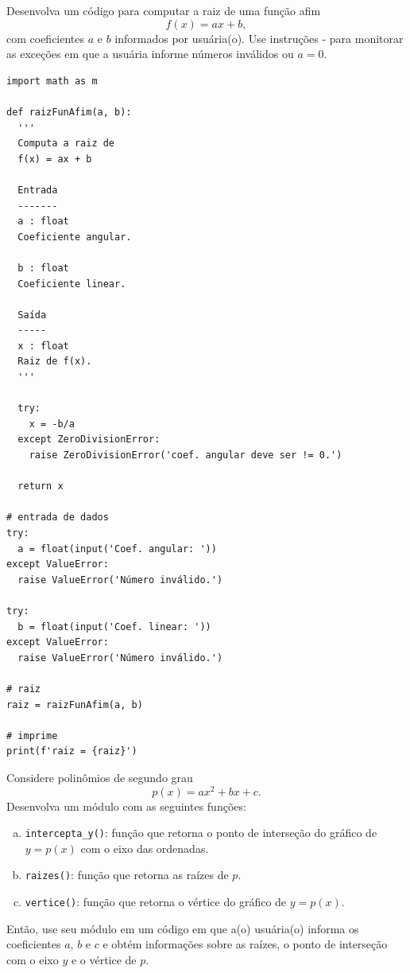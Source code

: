 \begin{exer}
  Desenvolva um código para computar a raiz de uma função afim
  \begin{equation}
    f(x) = ax + b,
  \end{equation}
  com coeficientes $a$ e $b$ informados por usuária(o). Use instruções {\PYTHONtry}-{\PYTHONexcept} para monitorar as exceções em que a usuária informe números inválidos ou $a=0$.
\end{exer}
\begin{resp}

\begin{lstlisting}
import math as m

def raizFunAfim(a, b):
  '''
  Computa a raiz de
  f(x) = ax + b

  Entrada
  -------
  a : float
  Coeficiente angular.

  b : float
  Coeficiente linear.

  Saída
  -----
  x : float
  Raiz de f(x).
  '''
  
  try:
    x = -b/a
  except ZeroDivisionError:
    raise ZeroDivisionError('coef. angular deve ser != 0.')

  return x

# entrada de dados
try:
  a = float(input('Coef. angular: '))
except ValueError:
  raise ValueError('Número inválido.')

try:
  b = float(input('Coef. linear: '))
except ValueError:
  raise ValueError('Número inválido.')

# raiz
raiz = raizFunAfim(a, b)

# imprime
print(f'raiz = {raiz}')
\end{lstlisting}

\end{resp}

\begin{exer}
  Considere polinômios de segundo grau
  \begin{equation}
    p(x) = ax^2 + bx + c.
  \end{equation}
  Desenvolva um módulo com as seguintes funções:
  \begin{enumerate}[a)]
  \item \lstinline+intercepta_y()+: função que retorna o ponto de interseção do gráfico de $y = p(x)$ com o eixo das ordenadas.
  \item \lstinline+raizes()+: função que retorna as raízes de $p$.
  \item \lstinline+vertice()+: função que retorna o vértice do gráfico de $y=p(x)$.
  \end{enumerate}
  Então, use seu módulo em um código em que a(o) usuária(o) informa os coeficientes $a$, $b$ e $c$ e obtém informações sobre as raízes, o ponto de interseção com o eixo $y$ e o vértice de $p$. 
\end{exer}

